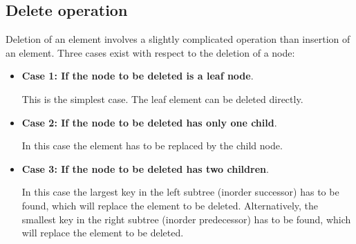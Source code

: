 \documentclass[a4paper,11pt]{book}
\begin{document}
\subsection{Delete operation}

\noindent Deletion of an element involves a slightly complicated operation than insertion of an element. Three cases exist with respect to the deletion of a node:

\begin{itemize}
    \item \textbf{Case 1: If the node to be deleted is a leaf node}.
    
    This is the simplest case. The leaf element can be deleted directly.
    \item \textbf{Case 2: If the node to be deleted has only one child}.
    
    In this case the element has to be replaced by the child node.
    \item \textbf{Case 3: If the node to be deleted has two children}.
    
    In this case the largest key in the left subtree (inorder successor) has to be found, which will replace the element to be deleted. Alternatively, the smallest key in the right subtree (inorder predecessor) has to be found, which will replace the element to be deleted.
\end{itemize}
\end{document}
